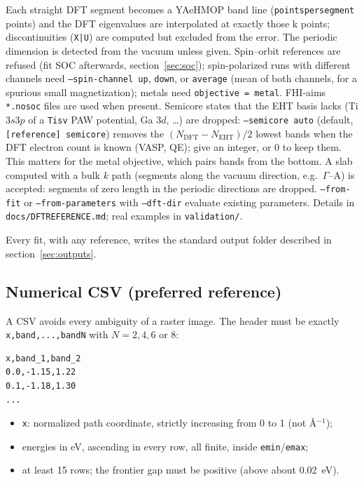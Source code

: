 \documentclass[11pt,a4paper]{article}
\newcommand{\cmd}[1]{\texttt{#1}}
\renewcommand{\_}{\origunderscore\allowbreak}
\begin{document}
Each straight DFT segment becomes a YAeHMOP band line (\cmd{points\_per\_segment} points) and the DFT
eigenvalues are interpolated at exactly those k points; discontinuities (\cmd{X|U}) are computed but excluded
from the error. The periodic dimension is detected from the vacuum unless given. Spin--orbit references
are refused (fit SOC afterwards, section~\ref{sec:soc}); spin-polarized runs with different channels need
\cmd{--spin-channel up}, \cmd{down}, or \cmd{average} (mean of both channels, for a spurious small
magnetization); metals need \cmd{objective = metal}. FHI-aims \cmd{*.no\_soc} files are used when present.
Semicore states that the EHT basis lacks (Ti $3s3p$ of a \cmd{Ti\_sv} PAW potential, Ga $3d$, \ldots) are dropped:
\cmd{--semicore auto} (default, \cmd{[reference] semicore}) removes the $(N_\mathrm{DFT}-N_\mathrm{EHT})/2$ lowest
bands when the DFT electron count is known (VASP, QE); give an integer, or 0 to keep them. This matters for
the metal objective, which pairs bands from the bottom. A slab computed with a bulk $k$ path (segments along
the vacuum direction, e.g.\ $\Gamma$--A) is accepted: segments of zero length in the periodic directions are
dropped. \cmd{--from-fit} or \cmd{--from-parameters} with \cmd{--dft-dir} evaluate existing parameters.
Details in \cmd{docs/DFT\_REFERENCE.md}; real examples in \cmd{validation/}.

Every fit, with any reference, writes the standard output folder described in
section~\ref{sec:outputs}.

\subsection{Numerical CSV (preferred reference)}

A CSV avoids every ambiguity of a raster image. The header must be exactly
\cmd{x,band\_1,...,band\_N} with $N = 2, 4, 6$ or $8$:

\begin{lstlisting}
x,band_1,band_2
0.0,-1.15,1.22
0.1,-1.18,1.30
...
\end{lstlisting}

\begin{itemize}[nosep]
  \item \cmd{x}: normalized path coordinate, strictly increasing from 0 to 1 (not \AA$^{-1}$);
  \item energies in eV, ascending in every row, all finite, inside \cmd{emin}/\cmd{emax};
  \item at least 15 rows; the frontier gap must be positive (above about 0.02~eV).
\end{itemize}
\end{document}
